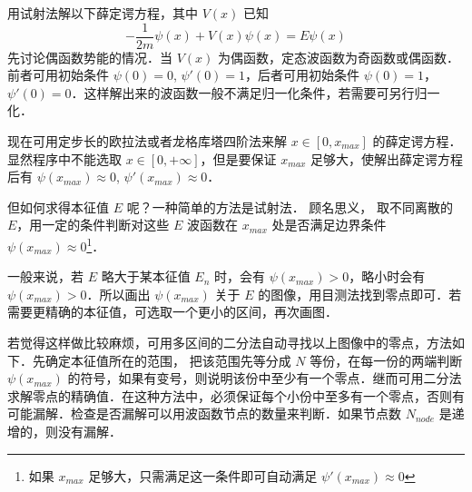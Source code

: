 用试射法解以下薛定谔方程，其中 $V(x)$ 已知
\begin{equation}
-\frac{1}{2m}\psi(x) + V(x)\psi(x) = E \psi(x)
\end{equation}
先讨论偶函数势能的情况．当 $V(x)$ 为偶函数，定态波函数为奇函数或偶函数．前者可用初始条件 $\psi(0)=0$, $\psi'(0)=1$，后者可用初始条件 $\psi(0)=1$， $\psi'(0)=0$．这样解出来的波函数一般不满足归一化条件，若需要可另行归一化．

现在可用定步长的欧拉法或者龙格库塔四阶法来解 $x\in [0, x_{max}]$ 的薛定谔方程．显然程序中不能选取 $x\in [0,+\infty]$，但是要保证 $x_{max}$ 足够大，使解出薛定谔方程后有 $\psi(x_{max})\approx 0$, $\psi'(x_{max})\approx 0$．

但如何求得本征值 $E$ 呢？一种简单的方法是试射法． 顾名思义， 取不同离散的 $E$，用一定的条件判断对这些 $E$ 波函数在 $x_{max}$ 处是否满足边界条件 $\psi(x_{max}) \approx 0$\footnote{如果 $x_{max}$ 足够大，只需满足这一条件即可自动满足 $\psi'(x_{max})\approx 0$}．

一般来说，若 $E$ 略大于某本征值 $E_n$ 时，会有 $\psi(x_{max})>0$，略小时会有 $\psi(x_{max})>0$．所以画出 $\psi(x_{max})$ 关于 $E$ 的图像，用目测法找到零点即可．若需要更精确的本征值，可选取一个更小的区间，再次画图．

若觉得这样做比较麻烦，可用多区间的二分法自动寻找以上图像中的零点，方法如下．先确定本征值所在的范围， 把该范围先等分成 $N$ 等份，在每一份的两端判断 $\psi(x_{max})$ 的符号，如果有变号，则说明该份中至少有一个零点．继而可用二分法求解零点的精确值．在这种方法中，必须保证每个小份中至多有一个零点，否则有可能漏解．检查是否漏解可以用波函数节点的数量来判断．如果节点数 $N_{node}$ 是递增的，则没有漏解．